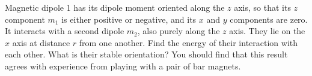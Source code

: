 Magnetic dipole 1 has its dipole moment oriented along the $z$ axis, so that
its $z$ component $m_1$ is either positive or negative, and its $x$ and $y$ components
are zero. It interacts with a second dipole $m_2$, also purely along the $z$ axis.
They lie on the $x$ axis at distance $r$ from one another. Find the energy of their
interaction with each other. What is their stable orientation? You should find
that this result agrees with experience from playing with a pair of bar magnets.\answercheck
